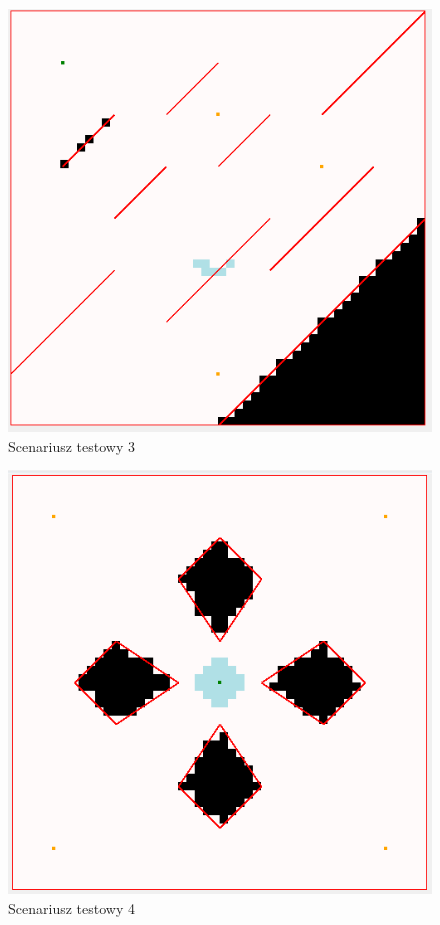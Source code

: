 \documentclass[11pt, leqno]{article}
\begin{document}
\begin{figure}[h!]
	\centering
	\includegraphics[scale=0.4]{scenario3}
	\caption{Scenariusz testowy 3}
	\label{fig:sc3}
\end{figure}

\begin{figure}[h!]
	\centering
	\includegraphics[scale=0.4]{scenario4}
	\caption{Scenariusz testowy 4}
	\label{fig:sc4}
\end{figure}
\end{document}

